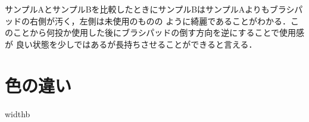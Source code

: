 \documentclass[main]{subfiles}
\begin{document}
サンプルAとサンプルBを比較したときにサンプルBはサンプルAよりもブラシパッドの右側が汚く，左側は未使用のものの
ように綺麗であることがわかる．このことから何投か使用した後にブラシパッドの倒す方向を逆にすることで使用感が
良い状態を少しではあるが長持ちさせることができると言える．
\\

\section{色の違い}
widthb
\end{document}
